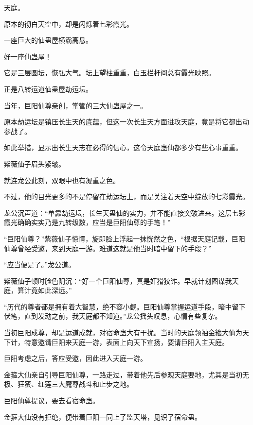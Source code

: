 
\begin{this_body}



天庭。

原本的彻白天空中，却是闪烁着七彩霞光。

一座巨大的仙蛊屋横霸高悬。

好一座仙蛊屋！

它是三层圆坛，恢弘大气。坛上望柱重重，白玉栏杆间总有霞光映照。

正是八转运道仙蛊屋劫运坛。

当年，巨阳仙尊亲创，掌管的三大仙蛊屋之一。

原本劫运坛是镇压长生天的底蕴，但这一次长生天方面进攻天庭，竟是将它都出动参战了。

如此举措，显示出长生天志在必得的信心，这令天庭蛊仙都多少有些心事重重。

紫薇仙子眉头紧皱。

就连龙公此刻，双眼中也有凝重之色。

不过，他的目光更多的不是停留在劫运坛上，而是关注着天空中绽放的七彩霞光。

龙公沉声道：“单靠劫运坛，长生天蛊仙的实力，并不能直接突破进来。这层七彩霞光确确实实乃是九转级数，应当是巨阳仙尊的手笔！”

“巨阳仙尊？”紫薇仙子惊愕，旋即脸上浮起一抹恍然之色，“根据天庭记载，巨阳仙尊曾经受邀，来到天庭一游。难道这就是他当时暗中留下的手段？”

“应当便是了。”龙公道。

紫薇仙子顿时脸色阴沉：“好一个巨阳仙尊，真是奸猾狡诈。早就计划图谋我天庭，算计竟如此深远。”

“历代的尊者都是拥有着大智慧，绝不容小觑。巨阳仙尊掌握运道手段，暗中留下伏笔，直到发动之前，我天庭都不知道。”龙公摇头叹息，心情有些复杂。

当初巨阳成尊，却是运道成就，对宿命蛊大有干扰。当时的天庭领袖金箍大仙为天下计，特意邀请巨阳来天庭一游，表面上向天下宣扬，要请巨阳入主天庭。

巨阳考虑之后，答应受邀，因此进入天庭一游。

金箍大仙亲自引导巨阳仙尊，一路走过，带着他先后参观天庭要地，尤其是当初无极、狂蛮、红莲三大魔尊战斗和止步之地。

巨阳仙尊提议，要去看宿命蛊。

金箍大仙没有拒绝，便带着巨阳一同上了监天塔，见识了宿命蛊。


\end{this_body}
